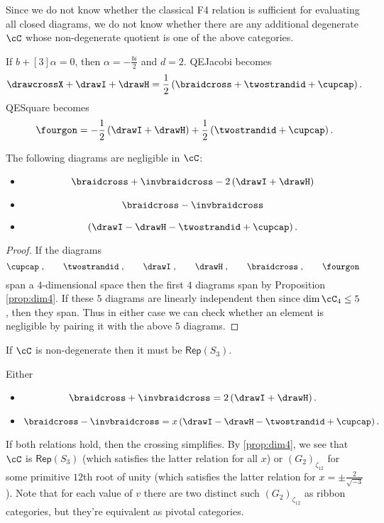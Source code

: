 \documentclass[12pt]{amsart}
\begin{document}
Since we do not know whether the classical F4 relation is sufficient for evaluating all closed diagrams, we do not know whether there are any additional degenerate $\cC$ whose non-degenerate quotient is one of the above categories.

If $b+[3]\alpha = 0$, then $\alpha = -\frac{bi}{2}$ and $d = 2$.  QEJacobi becomes
$$\drawcrossX + \drawI + \drawH = \frac{1}{2} \left(\braidcross + \twostrandid + \cupcap \right).$$
QESquare becomes
$$\fourgon = -\frac{1}{2} \left(\drawI + \drawH \right) + \frac{1}{2} \left(\twostrandid + \cupcap\right).$$

\begin{lemma}
The following diagrams are negligible in $\cC$:
\begin{itemize}
\item $$\braidcross + \invbraidcross - 2 \left(\drawI + \drawH \right)$$
\item $$\braidcross - \invbraidcross$$
\item $$\left(\drawI - \drawH - \twostrandid + \cupcap\right).$$
\end{itemize}
\end{lemma}
\begin{proof}
If the diagrams
  \[
  \cupcap\;,\qquad\twostrandid\;,
    \qquad\drawI\;,\qquad\drawH\;,\qquad\braidcross\;,\qquad\fourgon\;
   \]
 span a $4$-dimensional space then the first $4$ diagrams span by Proposition \ref{prop:dim4}.  If these $5$ diagrams are linearly independent then since $\dim \cC_4 \leq 5$, then they span.  Thus in either case we can check whether an element is negligible by pairing it with the above $5$ diagrams.
\end{proof}

\begin{corollary}
If $\cC$ is non-degenerate then it must be $\mathsf{Rep}(S_3)$.
\end{corollary}

\begin{corollary}
Either
\begin{itemize}
\item $$\braidcross + \invbraidcross = 2 \left(\drawI + \drawH \right).$$
\item $$\braidcross - \invbraidcross = x \left(\drawI - \drawH - \twostrandid + \cupcap\right).$$
\end{itemize}
\end{corollary}

If both relations hold, then the crossing simplifies.  By \ref{prop:dim4}, we
see that $\cC$ is $\mathsf{Rep}(S_3)$ (which satisfies the latter relation for
all $x$) or $(G_2)_{\zeta_{12}}$ for some primitive $12$th root of unity
(which satisfies the latter relation for $x = \pm \frac{2}{\sqrt{-3}}$). Note
that for each value of $v$ there are two distinct such $(G_2)_{\zeta_{12}}$ as
ribbon categories, but they're equivalent as pivotal categories.
\end{document}
